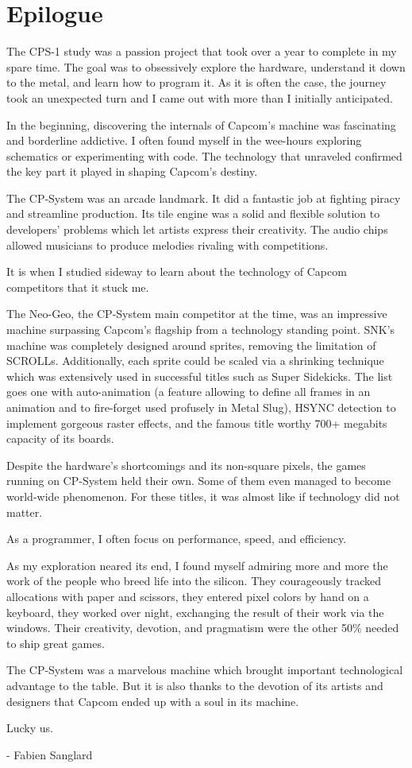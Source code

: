 \chapter{Epilogue} 

The CPS-1 study was a passion project that took over a year to complete in my spare time. The goal was to obsessively explore the hardware, understand it down to the metal, and learn how to program it. As it is often the case, the journey took an unexpected turn and I came out with  more than I initially anticipated.

In the beginning, discovering the internals of Capcom's machine was fascinating and borderline addictive. I often found myself in the wee-hours exploring schematics or experimenting with code. The technology that unraveled confirmed the key part it played in shaping Capcom's destiny. 

The CP-System was an arcade landmark. It did a fantastic job at fighting piracy and streamline production. Its tile engine was a solid and flexible solution to developers' problems which let artists express their creativity. The audio chips allowed musicians to produce melodies rivaling with competitions.

It is when I studied sideway to learn about the technology of Capcom competitors that it stuck me. 

The Neo-Geo, the CP-System main competitor at the time, was an impressive machine surpassing Capcom's flagship from a technology standing point. SNK's machine was completely designed around sprites, removing the limitation of SCROLLs. Additionally, each sprite could be scaled via a shrinking technique which was extensively used in successful titles such as Super Sidekicks. The list goes one with auto-animation (a feature allowing to define all frames in an animation and to fire-forget used profusely in Metal Slug), HSYNC detection to implement gorgeous raster effects, and the famous title worthy 700+ megabits capacity of its boards.

Despite the hardware's shortcomings and its non-square pixels, the games running on CP-System held their own. Some of them even managed to become world-wide phenomenon. For these titles, it was almost like if technology did not matter.

As a programmer, I often focus on performance, speed, and efficiency. 

As my exploration neared its end, I found myself admiring more and more the work of the people who breed life into the silicon.   
They courageously tracked allocations with paper and scissors, they entered pixel colors by hand on a keyboard, they worked over night, exchanging the result of their work via the windows. Their creativity, devotion, and pragmatism were the other 50\% needed to ship great games.

The CP-System was a marvelous machine which brought important technological advantage to the table. But it is also thanks to the devotion of its artists and designers that Capcom ended up with a soul in its machine.

Lucky us.

- Fabien Sanglard
